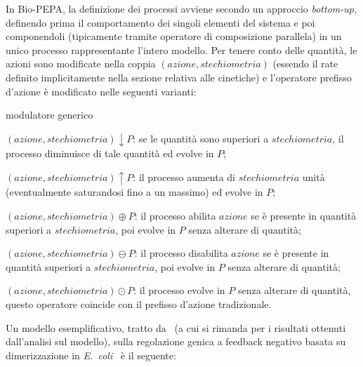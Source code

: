 		In Bio-PEPA, la  definizione dei processi avviene secondo un approccio \emph{bottom-up}, definendo prima il comportamento dei singoli elementi del sistema e poi componendoli (tipicamente tramite operatore di composizione parallela) in un unico processo rappresentante l'intero modello.
		Per tenere conto delle quantit\`a, le azioni sono modificate nella coppia $(azione, stechiometria)$ (essendo il rate definito implicitamente nella sezione relativa alle cinetiche) e l'operatore prefisso d'azione \`e modificato nelle seguenti varianti:
		\begin{labeling}{modulatore generico}
			\item [reagente] $(azione, stechiometria) \downarrow P$: se le quantit\`a sono superiori a $stechiometria$, il processo diminuisce di tale quantit\`a ed evolve in $P$;
			\item [prodotto] $(azione, stechiometria) \uparrow P$: il processo aumenta di $stechiometria$ unit\`a (eventualmente saturandosi fino a un massimo) ed evolve in $P$;
			\item [attivatore] $(azione, stechiometria) \oplus P$: il processo abilita $azione$ se \`e presente in quantit\`a superiori a $stechiometria$, poi evolve in $P$ senza alterare di quantit\`a;
			\item [inattivatore] $(azione, stechiometria) \ominus P$: il processo disabilita $azione$ se \`e presente in quantit\`a superiori a $stechiometria$, poi evolve in $P$ senza alterare di quantit\`a;
			\item [modulatore generico] $(azione, stechiometria) \odot P$: il processo evolve in $P$ senza alterare di quantit\`a, questo operatore coincide con il prefisso d'azione tradizionale.
		\end{labeling}
		
		Un modello esemplificativo, tratto da~\cite{ciocchetta2009bio} (a cui si rimanda per i risultati ottenuti dall'analisi sul modello), sulla regolazione genica a feedback negativo basata su dimerizzazione in \emph{E.\ coli}~\cite{bundschuh2003fluctuations} \`e il seguente:
				
